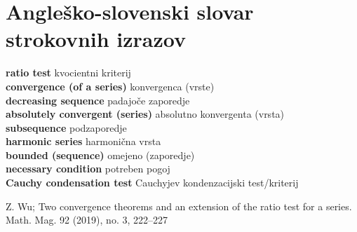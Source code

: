 \documentclass[a4paper,12pt]{article}
\newcommand{\geslo}[2]{\noindent\textbf{#1} \quad \hangindent=1cm #2\\[-1pc]}
\begin{document}
\section{Angleško-slovenski slovar strokovnih izrazov}

\geslo{ratio test}{kvocientni kriterij}

\geslo{convergence (of a series)}{konvergenca (vrste)}

\geslo{decreasing sequence}{padajoče zaporedje}

\geslo{absolutely convergent (series)}{absolutno konvergenta (vrsta)}

\geslo{subsequence}{podzaporedje}

\geslo{harmonic series}{harmonična vrsta}

\geslo{bounded (sequence)}{omejeno (zaporedje)}

\geslo{necessary condition}{potreben pogoj}

\geslo{Cauchy condensation test}{Cauchyjev kondenzacijski test/kriterij}



















\begin{thebibliography}{1}
    Z. Wu; Two convergence theorems and an extension of the ratio test for a
    series. Math. Mag. 92 (2019), no. 3, 222–227
\end{thebibliography}

\end{document}
